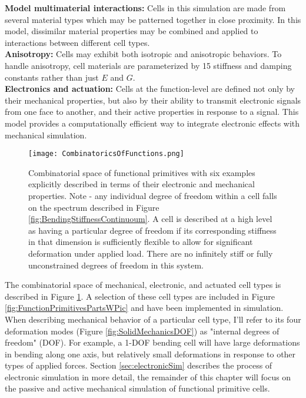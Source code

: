 {\textbf{Model multimaterial interactions:} Cells in this simulation are made from several material types which may be patterned together in close proximity.  In this model, dissimilar material properties may be combined and applied to interactions between different cell types.\\

\textbf{Anisotropy:} Cells may exhibit both isotropic and anisotropic behaviors.  To handle anisotropy, cell materials are parameterized by 15 stiffness and damping constants rather than just $E$ and $G$.\\

\textbf{Electronics and actuation:} Cells at the function-level are defined not only by their mechanical properties, but also by their ability to transmit electronic signals from one face to another, and their active properties in response to a signal.  This model provides a computationally efficient way to integrate electronic effects with mechanical simulation. \\

\begin{figure}
  \texttt{[image: CombinatoricsOfFunctions.png]}
  \caption{Combinatorial space of functional primitives with six examples explicitly described in terms of their electronic and mechanical properties.  Note - any individual degree of freedom within a cell falls on the spectrum described in Figure \ref{fig:BendingStiffnessContinuoum}.  A cell is described at a high level as having a particular degree of freedom if its corresponding stiffness in that dimension is sufficiently flexible to allow for significant deformation under applied load.  There are no infinitely stiff or fully unconstrained degrees of freedom in this system.}
  \label{fig:CombinatoricsOfFunctions}
\end{figure}

 The combinatorial space of mechanical, electronic, and actuated cell types is described in Figure \ref{fig:CombinatoricsOfFunctions}.  A selection of these cell types are included in Figure \ref{fig:FunctionPrimitivesPartsWPic} and have been implemented in simulation.  When describing mechanical behavior of a particular cell type, I'll refer to its four deformation modes (Figure \ref{fig:SolidMechanicsDOF}) as "internal degrees of freedom" (DOF).  For example, a 1-DOF bending cell will have large deformations in bending along one axis, but relatively small deformations in response to other types of applied forces.  Section \ref{sec:electronicSim} describes the process of electronic simulation in more detail, the remainder of this chapter will focus on the passive and active mechanical simulation of functional primitive cells.

}
